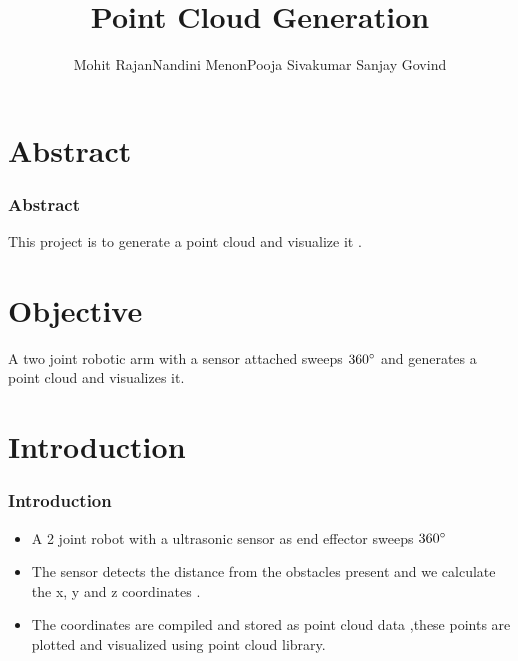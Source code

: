 \documentclass{beamer}
\title[Design Project]{Point Cloud Generation}
\author{Mohit Rajan\newline Nandini Menon\newline Pooja Sivakumar   \newline Sanjay Govind}
\institute[FISAT] %
{
FISAT \\ %
\medskip
}
\begin{document}
\begin{frame}
\titlepage %
\end{frame}



\section{Abstract} %

\begin{frame}
\frametitle{Abstract}
\par This project is to generate a point cloud  and visualize it  .
\end{frame}

\section{Objective}
\begin{frame}
\par A two joint robotic arm with a sensor attached sweeps $360\degree$  and generates a point cloud and visualizes it.
\end{frame}



\section{Introduction}

\begin{frame}
\frametitle{Introduction}
\begin{itemize}
\item A 2 joint robot with a  ultrasonic sensor as end effector sweeps $360\degree$
\item The sensor detects the distance  from  the obstacles present and we calculate the x, y and z coordinates .
\item The coordinates are compiled and stored as point cloud data ,these points are plotted and visualized using point cloud library.
\end{itemize}
\end{frame}
\end{document}
